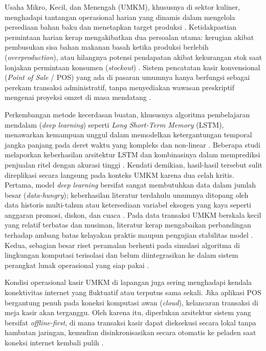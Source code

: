 \documentclass[10pt,a4paper]{article}
\begin{document}
Usaha Mikro, Kecil, dan Menengah (UMKM), khususnya di sektor kuliner, menghadapi tantangan operasional harian yang dinamis dalam mengelola persediaan bahan baku dan menetapkan target produksi \cite{mansur2025sales, sipayung2020evaluasi}. Ketidakpastian permintaan harian kerap mengakibatkan dua persoalan utama: kerugian akibat pembusukan sisa bahan makanan basah ketika produksi berlebih (\textit{overproduction}), atau hilangnya potensi pendapatan akibat kekurangan stok saat lonjakan permintaan konsumen (\textit{stockout}) \cite{sembiring2025analisa}. Sistem pencatatan kasir konvensional (\textit{Point of Sale} / POS) yang ada di pasaran umumnya hanya berfungsi sebagai perekam transaksi administratif, tanpa menyediakan wawasan preskriptif mengenai proyeksi omzet di masa mendatang \cite{siddik2020rancang}.

Perkembangan metode kecerdasan buatan, khususnya algoritma pembelajaran mendalam (\textit{deep learning}) seperti \textit{Long Short-Term Memory} (LSTM), menawarkan kemampuan unggul dalam memodelkan ketergantungan temporal jangka panjang pada deret waktu yang kompleks dan non-linear \cite{hochreiter1997long, mitra2024harnessing}. Beberapa studi melaporkan keberhasilan arsitektur LSTM dan kombinasinya dalam memprediksi penjualan ritel dengan akurasi tinggi \cite{moraes2024hybrid, yadav2025retail, jannah2025analisis}. Kendati demikian, hasil-hasil tersebut sulit direplikasi secara langsung pada konteks UMKM karena dua celah kritis. Pertama, model \textit{deep learning} bersifat sangat membutuhkan data dalam jumlah besar (\textit{data-hungry}); keberhasilan literatur terdahulu umumnya ditopang oleh data historis multi-tahun \cite{moraes2024hybrid} atau ketersediaan variabel eksogen yang kaya seperti anggaran promosi, diskon, dan cuaca \cite{mansur2025sales}. Pada data transaksi UMKM berskala kecil yang relatif terbatas dan musiman, literatur kerap mengabaikan perbandingan terhadap ambang batas kelayakan praktis maupun pengujian stabilitas model \cite{makridakis2022m5}. Kedua, sebagian besar riset peramalan berhenti pada simulasi algoritma di lingkungan komputasi terisolasi dan belum diintegrasikan ke dalam sistem perangkat lunak operasional yang siap pakai \cite{verdiyanto2025pengembangan}.

Kondisi operasional kasir UMKM di lapangan juga sering menghadapi kendala konektivitas internet yang fluktuatif atau terputus sama sekali. Jika aplikasi POS bergantung penuh pada koneksi komputasi awan (\textit{cloud}), kelancaran transaksi di meja kasir akan terganggu. Oleh karena itu, diperlukan arsitektur sistem yang bersifat \textit{offline-first}, di mana transaksi kasir dapat dieksekusi secara lokal tanpa hambatan jaringan, kemudian disinkronisasikan secara otomatis ke peladen saat koneksi internet kembali pulih \cite{pressman2020software}.
\end{document}

